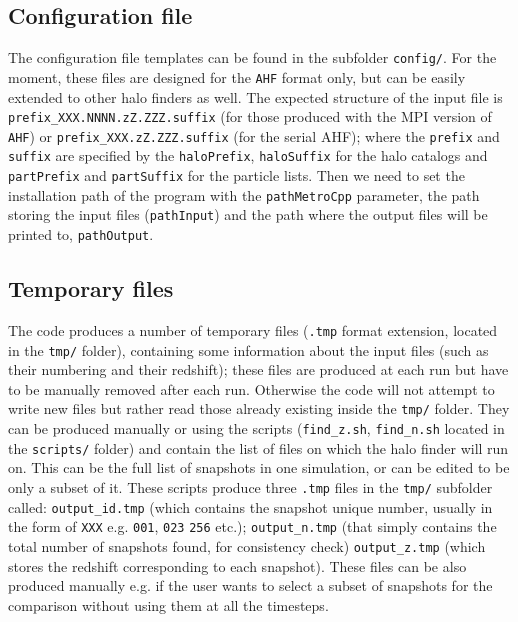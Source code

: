 \documentclass{article}
\begin{document}
\subsection{Configuration file}

The configuration file templates can be found in the subfolder \texttt{config/}. For the moment, these files are
designed for the \texttt{AHF} format only, but can be easily extended to other halo finders as well.
The expected structure of the input file is \texttt{prefix\_XXX.NNNN.zZ.ZZZ.suffix} (for those produced with the 
MPI version of \texttt{AHF}) or \texttt{prefix\_XXX.zZ.ZZZ.suffix} (for the serial AHF); where the \texttt{prefix} and
\texttt{suffix} are specified by the \texttt{haloPrefix}, \texttt{haloSuffix} for the halo catalogs and 
\texttt{partPrefix} and \texttt{partSuffix} for the particle lists.
Then we need to set the installation path of the program with the \texttt{pathMetroCpp} parameter, the path storing 
the input files (\texttt{pathInput}) and the path where the output files will be printed to, \texttt{pathOutput}.


\subsection{Temporary files}

The code produces a number of temporary files (\texttt{.tmp} format extension, located in the \texttt{tmp/} folder), containing
some information about the input files (such as their numbering and their redshift); these files are produced at each run but have
to be manually removed after each run. Otherwise the code will not attempt to write new files but rather read those already existing
inside the \texttt{tmp/} folder.
They can be produced manually or using the scripts (\texttt{find\_z.sh}, \texttt{find\_n.sh} located in the \texttt{scripts/} folder)
and contain the list of files on which the halo finder will run on.
This can be the full list of snapshots in one simulation, or can be edited to be only a subset of it.
These scripts produce three \texttt{.tmp} files in the \texttt{tmp/} subfolder called:
\texttt{output\_id.tmp} (which contains the snapshot unique number, usually in the form of \texttt{XXX} e.g. \texttt{001}, \texttt{023} 
\texttt{256} etc.); \texttt{output\_n.tmp} (that simply contains the total number of snapshots found, for consistency check)
\texttt{output\_z.tmp} (which stores the redshift corresponding to each snapshot).
These files can be also produced manually e.g. if the user wants to select a subset of snapshots for the comparison 
without using them at all the timesteps.
\end{document}

